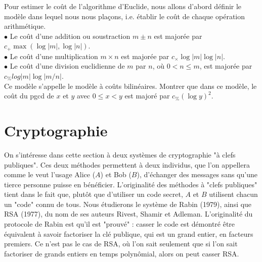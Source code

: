 \begin{enumerate}
Pour estimer le coût de l'algorithme d'Euclide, nous allons d'abord définir le modèle dans lequel nous nous plaçons, i.e. établir le coût de chaque opération arithmétique. \\

$\bullet$ Le coût d'une addition ou soustraction $m\pm n$ est majorée par $c_+ \max(\log|m|,\log |n|)$.\\
$\bullet$ Le coût d'une multiplication $m\times n$ est majorée par $c_\times \log |m| \log |n|$.\\
$\bullet$ Le coût d'une division euclidienne de $m$ par $n$, où $0<n\leq m$, est majorée par $c_\% log|m|\log |m/n|$.\\

Ce modèle s'appelle le modèle à coûts bilinéaires. Montrer que dans ce modèle, le coût du pgcd de $x$ et $y$ avec $0\leq x< y$ est majoré par $c_\% (\log y )^2$.
\end{enumerate}

\section{Cryptographie}

On s'intéresse dans cette section à deux systèmes de cryptographie "à clefs publiques". Ces deux méthodes permettent à deux individus, que l'on appellera comme le veut l'usage Alice ($A$) et Bob ($B$), d'échanger des messages sans qu'une tierce personne puisse en bénéficier. L'originalité des méthodes à "clefs publiques" tient dans le fait que, plutôt que d'utiliser un code secret, $A$ et $B$ utilisent chacun un "code" connu de tous. Nous étudierons le système de Rabin (1979), ainsi que RSA (1977), du nom de ses auteurs Rivest, Shamir et Adleman. L'originalité du protocole de Rabin est qu'il est "prouvé" : casser le code est démontré être équivalent à savoir factoriser la clé publique, qui est un grand entier, en facteurs premiers. Ce n'est pas le cas de RSA, où l'on sait seulement que si l'on sait factoriser de grands entiers en temps polynômial, alors on peut casser RSA.\\

